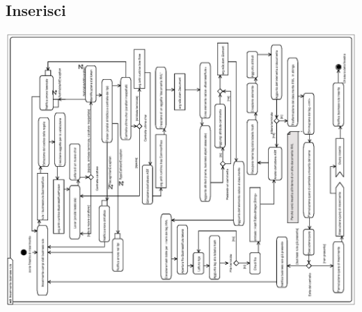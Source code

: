 \documentclass[11pt,titlepage,a4paper]{report}
\begin{document}
\subsection{Inserisci \br}
\begin{center}
 \includegraphics[width=1.3\textwidth, angle=-90]{InserisciBusinessRule2.eps}
\end{center}
\end{document}

